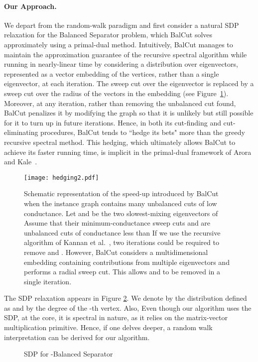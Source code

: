 \documentclass[twoside,leqno,twocolumn]{article}
\newcommand{\BS}{{\sc Balanced Separator}\xspace}
\newcommand{\SDP}{{\sf SDP}\xspace}
\numberwithin{equation}{section}
\newcommand{\alg}{{\sc BalCut}\xspace}
\begin{document}
\paragraph{Our Approach.} 
We depart from the random-walk paradigm and first consider  a natural {{\SDP}} relaxation for the {\BS} problem, which \alg solves approximately using a primal-dual method.
Intuitively, \alg manages to maintain the approximation guarantee of the recursive spectral algorithm while running in nearly-linear time by considering a distribution over eigenvectors,  represented as a vector embedding of the vertices, rather than a single eigenvector, at each iteration. The sweep cut over the eigenvector is replaced by a sweep cut over the radius of the vectors in the embedding (see Figure~\ref{fig:hedging}).
Moreover, at any iteration, rather than removing the unbalanced cut found, \alg penalizes it by modifying the graph so that it is unlikely but still possible for it to turn up in future iterations. Hence, in both its cut-finding and cut-eliminating procedures, \alg tends to ``hedge its bets" more than the greedy recursive spectral method. This hedging, which ultimately allows \alg to achieve its faster running time, is implicit in the primal-dual framework of Arora and Kale~\cite{AK}.

\begin{figure}[!h]
\begin{center}
\texttt{[image: hedging2.pdf]}
\caption{Schematic representation of the speed-up introduced by \alg when the instance graph contains many unbalanced cuts of low conductance. Let  and  be the two slowest-mixing eigenvectors of  Assume that their minimum-conductance sweep cuts  and  are unbalanced cuts of conductance less than  If we use the recursive algorithm of Kannan et al.~\cite{Kannan}, two iterations could be required to remove  and . However, \alg considers a multidimensional embedding containing contributions from multiple eigenvectors and performs a radial sweep cut. This allows  and  to be removed in a single iteration.}
\label{fig:hedging}
\end{center}
\vspace{-8mm}
\end{figure}



The {{\SDP}} relaxation appears in Figure \ref{fig:sdp-intro}.
We denote by  the distribution defined as  and by  the degree of the -th vertex. Also, 
Even though our algorithm uses the {{\SDP}}, at the core, it is spectral in nature, as it relies on the matrix-vector multiplication primitive. Hence, if one delves deeper, a random walk interpretation can be derived for our algorithm.
\begin{figure}[htb]


\label{fig:sdp-intro}
\caption{{\SDP} for -\BS}
\end{figure}
\end{document}
